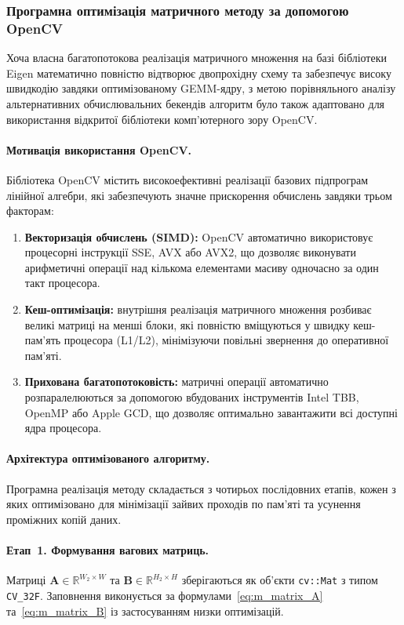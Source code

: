 \subsubsection{Програмна оптимізація матричного методу за допомогою OpenCV}

Хоча власна багатопотокова реалізація матричного множення на базі
бібліотеки Eigen математично повністю відтворює двопрохідну схему та
забезпечує високу швидкодію завдяки оптимізованому GEMM-ядру, з метою
порівняльного аналізу альтернативних обчислювальних бекендів алгоритм
було також адаптовано для використання відкритої бібліотеки комп'ютерного
зору OpenCV.

\paragraph{Мотивація використання OpenCV.}
Бібліотека OpenCV містить високоефективні реалізації базових підпрограм
лінійної алгебри, які забезпечують значне прискорення обчислень завдяки
трьом факторам:
\begin{enumerate}
	\item \textbf{Векторизація обчислень (SIMD):} OpenCV автоматично
	використовує процесорні інструкції SSE, AVX або AVX2, що дозволяє
	виконувати арифметичні операції над кількома елементами масиву
	одночасно за один такт процесора.
	\item \textbf{Кеш-оптимізація:} внутрішня реалізація матричного
	множення розбиває великі матриці на менші блоки, які повністю вміщуються у швидку кеш-пам'ять
	процесора (L1/L2), мінімізуючи повільні звернення до оперативної
	пам'яті.
	\item \textbf{Прихована багатопотоковість:} матричні операції
	автоматично розпаралелюються за допомогою вбудованих інструментів
	Intel TBB, OpenMP або Apple GCD, що дозволяє оптимально завантажити
	всі доступні ядра процесора.
\end{enumerate}

\paragraph{Архітектура оптимізованого алгоритму.}
Програмна реалізація методу складається з чотирьох послідовних
етапів, кожен з яких оптимізовано для мінімізації зайвих проходів по
пам'яті та усунення проміжних копій даних.

\paragraph{Етап~1. Формування вагових матриць.}
Матриці $\mathbf{A} \in \mathbb{R}^{W_2 \times W}$ та $\mathbf{B} \in \mathbb{R}^{H_2 \times H}$ зберігаються як об'єкти \texttt{cv::Mat} з типом
\texttt{CV\_32F}. Заповнення
виконується за формулами~\eqref{eq:m_matrix_A}
та~\eqref{eq:m_matrix_B} із застосуванням низки оптимізацій.

